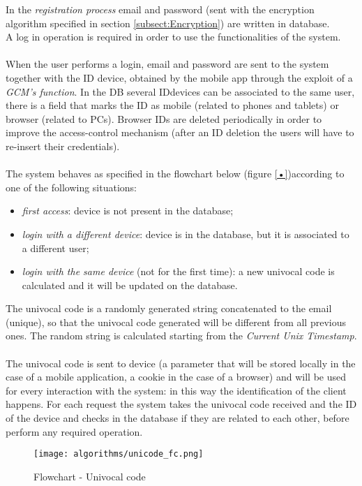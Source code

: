 In the \textit{registration process} email and password (sent with the encryption algorithm specified in section \ref{subsect:Encryption}) are written in database.\\
A log in operation is required in order to use the functionalities of the system.
\\\\
When the user performs a login, email and password are sent to the system together with the ID device, obtained by the mobile app through the exploit of a \textit{GCM's function}. In the DB several IDdevices can be associated to the same user, there is a field that marks the ID as mobile (related to phones and tablets) or browser (related to PCs). Browser IDs are deleted periodically in order to improve the access-control mechanism (after an ID deletion the users will have to re-insert their credentials).
\\\\
The system behaves as specified in the flowchart below (figure \ref{•})according to one of the following situations:
\begin{itemize}
\item \textit{first access}: device is not present in the database;
\item \textit{login with a different device}: device is in the database, but it is associated to a different user;
\item \textit{login with the same device} (not for the first time): a new univocal code is calculated and it will be updated on the database.
\end{itemize}
The univocal code is a randomly generated string concatenated to the email (unique), so that the univocal code generated will be different from all previous ones. The random string is calculated starting from the \textit{Current Unix Timestamp}.
\\\\
The univocal code is sent to device (a parameter that will be stored locally in the case of a mobile application, a cookie in the case of a browser) and will be used for every interaction with the system: in this way the identification of the client happens. For each request the system takes the univocal code received and the ID of the device and checks in the database if they are related to each other, before perform any required operation. 
\begin{figure}[H]
	\begin{center}
		\texttt{[image: algorithms/unicode\_fc.png]}
	\caption{Flowchart - Univocal code}
	\end{center}
\end{figure}
